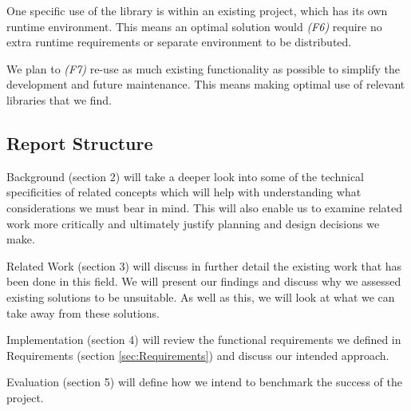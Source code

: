 One specific use of the library is within an existing project, which has its own runtime environment. This means an optimal solution would \emph{(F6)} require no extra runtime requirements or separate environment to be distributed.

We plan to \emph{(F7)} re-use as much existing functionality as possible to simplify the development and future maintenance. This means making optimal use of relevant libraries that we find.

\subsection{Report Structure}

Background (section 2) will take a deeper look into some of the technical specificities of related concepts which will help with understanding what considerations we must bear in mind. This will also enable us to examine related work more critically and ultimately justify planning and design decisions we make.

Related Work (section 3) will discuss in further detail the existing work that has been done in this field. We will present our findings and discuss why we assessed existing solutions to be unsuitable. As well as this, we will look at what we can take away from these solutions.

Implementation (section 4) will review the functional requirements we defined in Requirements (section \ref{sec:Requirements}) and discuss our intended approach.

Evaluation (section 5) will define how we intend to benchmark the success of the project.